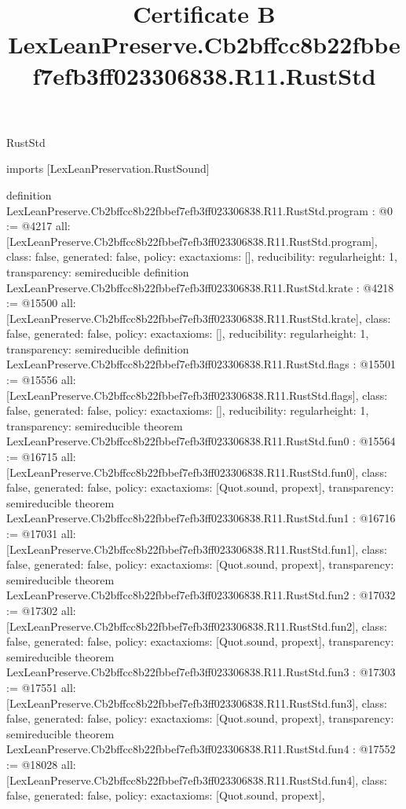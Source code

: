 \begin{lexlean}{RustStd}
\title{Certificate B LexLeanPreserve.Cb2bffcc8b22fbbef7efb3ff023306838.R11.RustStd}
\begin{coremodule}
imports [LexLeanPreservation.RustSound]

definition LexLeanPreserve.Cb2bffcc8b22fbbef7efb3ff023306838.R11.RustStd.program : @0 := @4217 {
  all: [LexLeanPreserve.Cb2bffcc8b22fbbef7efb3ff023306838.R11.RustStd.program],
  class: false,
  generated: false,
  policy: exact{axioms: []},
  reducibility: regular{height: 1},
  transparency: semireducible
}
definition LexLeanPreserve.Cb2bffcc8b22fbbef7efb3ff023306838.R11.RustStd.krate : @4218 := @15500 {
  all: [LexLeanPreserve.Cb2bffcc8b22fbbef7efb3ff023306838.R11.RustStd.krate],
  class: false,
  generated: false,
  policy: exact{axioms: []},
  reducibility: regular{height: 1},
  transparency: semireducible
}
definition LexLeanPreserve.Cb2bffcc8b22fbbef7efb3ff023306838.R11.RustStd.flags : @15501 := @15556 {
  all: [LexLeanPreserve.Cb2bffcc8b22fbbef7efb3ff023306838.R11.RustStd.flags],
  class: false,
  generated: false,
  policy: exact{axioms: []},
  reducibility: regular{height: 1},
  transparency: semireducible
}
theorem LexLeanPreserve.Cb2bffcc8b22fbbef7efb3ff023306838.R11.RustStd.fun0 : @15564 := @16715 {
  all: [LexLeanPreserve.Cb2bffcc8b22fbbef7efb3ff023306838.R11.RustStd.fun0],
  class: false,
  generated: false,
  policy: exact{axioms: [Quot.sound, propext]},
  transparency: semireducible
}
theorem LexLeanPreserve.Cb2bffcc8b22fbbef7efb3ff023306838.R11.RustStd.fun1 : @16716 := @17031 {
  all: [LexLeanPreserve.Cb2bffcc8b22fbbef7efb3ff023306838.R11.RustStd.fun1],
  class: false,
  generated: false,
  policy: exact{axioms: [Quot.sound, propext]},
  transparency: semireducible
}
theorem LexLeanPreserve.Cb2bffcc8b22fbbef7efb3ff023306838.R11.RustStd.fun2 : @17032 := @17302 {
  all: [LexLeanPreserve.Cb2bffcc8b22fbbef7efb3ff023306838.R11.RustStd.fun2],
  class: false,
  generated: false,
  policy: exact{axioms: [Quot.sound, propext]},
  transparency: semireducible
}
theorem LexLeanPreserve.Cb2bffcc8b22fbbef7efb3ff023306838.R11.RustStd.fun3 : @17303 := @17551 {
  all: [LexLeanPreserve.Cb2bffcc8b22fbbef7efb3ff023306838.R11.RustStd.fun3],
  class: false,
  generated: false,
  policy: exact{axioms: [Quot.sound, propext]},
  transparency: semireducible
}
theorem LexLeanPreserve.Cb2bffcc8b22fbbef7efb3ff023306838.R11.RustStd.fun4 : @17552 := @18028 {
  all: [LexLeanPreserve.Cb2bffcc8b22fbbef7efb3ff023306838.R11.RustStd.fun4],
  class: false,
  generated: false,
  policy: exact{axioms: [Quot.sound, propext]},
}
\end{coremodule}
\end{lexlean}
